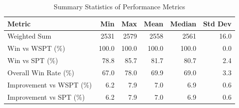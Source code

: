 \begin{table}[htbp]%
\centering%
\begin{tabular}{lrrrrr}%
\toprule%
\textbf{Metric}&\textbf{Min}&\textbf{Max}&\textbf{Mean}&\textbf{Median}&\textbf{Std Dev}\\%
\midrule%
Weighted Sum&2531&2579&2558&2561&16.0\\%
Win vs WSPT (\%)&100.0&100.0&100.0&100.0&0.0\\%
Win vs SPT (\%)&78.8&85.7&81.7&80.7&2.4\\%
Overall Win Rate (\%)&67.0&78.0&69.9&69.0&3.3\\%
Improvement vs WSPT (\%)&6.2&7.9&7.0&6.9&0.6\\%
Improvement vs SPT (\%)&6.2&7.9&7.0&6.9&0.6\\%
\bottomrule%
\end{tabular}%
\caption{Summary Statistics of Performance Metrics}%
\label{tab:metrics}%
\end{table}